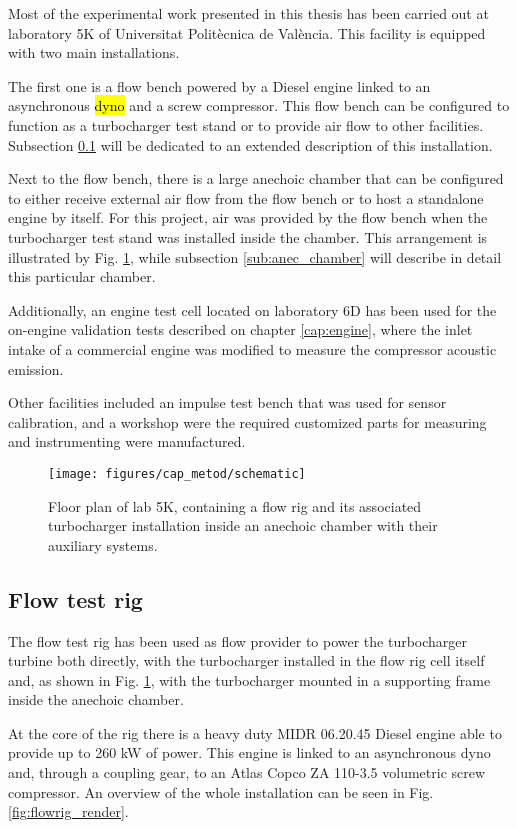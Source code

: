 Most of the experimental work presented in this thesis has been carried out at laboratory 5K of Universitat Politècnica de València. This facility is equipped with two main installations.

The first one is a flow bench powered by a Diesel engine linked to an asynchronous \hl{dyno} and a screw compressor. This flow bench can be configured to function as a turbocharger test stand or to provide air flow to other facilities. Subsection \ref{sub:flow_bench} will be dedicated to an extended description of this installation.

Next to the flow bench, there is a large anechoic chamber that can be configured to either receive external air flow from the flow bench or to host a standalone engine by itself. For this project, air was provided by the flow bench when the turbocharger test stand was installed inside the chamber. This arrangement is illustrated by Fig. \ref{fig:floorplan}, while subsection \ref{sub:anec_chamber} will describe in detail this particular chamber.

Additionally, an engine test cell located on laboratory 6D has been used for the on-engine validation tests described on chapter \ref{cap:engine}, where the inlet intake of a commercial engine was modified to measure the compressor acoustic emission.

Other facilities included an impulse test bench that was used for sensor calibration, and a workshop were the required customized parts for measuring and instrumenting were manufactured.

\begin{figure}[t!]
\centering
\texttt{[image: figures/cap\_metod/schematic]}
\caption{Floor plan of lab 5K, containing a flow rig and its associated turbocharger installation inside an anechoic chamber with their auxiliary systems.}
\label{fig:floorplan}
\end{figure}

\subsection{Flow test rig} \label{sub:flow_bench}

The flow test rig has been used as flow provider to power the turbocharger turbine both directly, with the turbocharger installed in the flow rig cell itself and, as shown in Fig. \ref{fig:floorplan}, with the turbocharger mounted in a supporting frame inside the anechoic chamber.

At the core of the rig there is a heavy duty MIDR 06.20.45 Diesel engine able to provide up to 260 kW of power. This engine is linked to an asynchronous dyno and, through a coupling gear, to an Atlas Copco ZA 110-3.5 volumetric screw compressor. An overview of the whole installation can be seen in Fig. \ref{fig:flowrig_render}.

